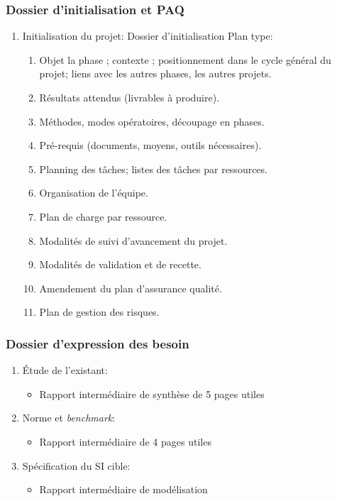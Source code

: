 \documentclass[twoside]{article}
\begin{document}
\subsubsection{Dossier d'initialisation et PAQ}
		\begin{enumerate}
			\item Initialisation du projet:
				Dossier d'initialisation
					Plan type:
						\begin{enumerate}
							\item Objet la phase ; contexte ; positionnement
                                dans le cycle général du projet; liens avec
                                les autres phases, les autres projets.
							\item Résultats attendus (livrables à produire).
							\item Méthodes, modes opératoires, découpage en 
                                    phases.
							\item Pré-requis (documents, moyens, outils
                                    nécessaires).
							\item Planning des tâches; listes des tâches par
                                    ressources.
							\item Organisation de l'équipe.
							\item Plan de charge par ressource.
							\item Modalités de suivi d'avancement du projet.
							\item Modalités de validation et de recette.
							\item Amendement du plan d'assurance qualité.
							\item Plan de gestion des risques.
						\end{enumerate}
		\end{enumerate}
\subsubsection{Dossier d'expression des besoin}
		\begin{enumerate}
			\item Étude de l'existant:
				\begin{itemize}
					\item Rapport intermédiaire de synthèse de 5 pages utiles
				\end{itemize}
			\item Norme et \textsl{benchmark}:
				\begin{itemize} 
					\item Rapport intermédiaire de 4 pages utiles
				\end{itemize}
			\item Spécification du SI cible:
				\begin{itemize} 
					\item Rapport intermédiaire de modélisation
				\end{itemize}
		\end{enumerate}
\end{document}
